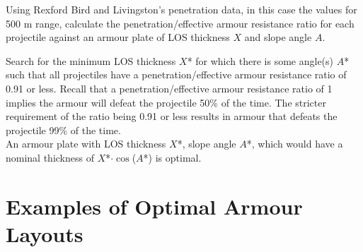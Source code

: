 \documentclass[]{article}
\begin{document}
Using Rexford Bird and Livingston’s penetration data, in this case the values for 500 m range, calculate the penetration/effective armour resistance ratio for each projectile against an armour plate of LOS thickness $X$ and slope angle $A$. 

Search for the minimum LOS thickness $X$* for which there is some angle(s) $A$* such that all projectiles have a penetration/effective armour resistance ratio of 0.91 or less. Recall that a penetration/effective armour resistance ratio of 1 implies the armour will defeat the projectile 50\% of the time. The stricter requirement of the ratio being 0.91 or less results in armour that defeats the projectile 99\% of the time.
\\

\noindent An armour plate with LOS thickness $X$*, slope angle $A$*, which would have a nominal thickness of $X$*$\cdot\cos$($A$*) is optimal.

\section{Examples of Optimal Armour Layouts}
\end{document}
